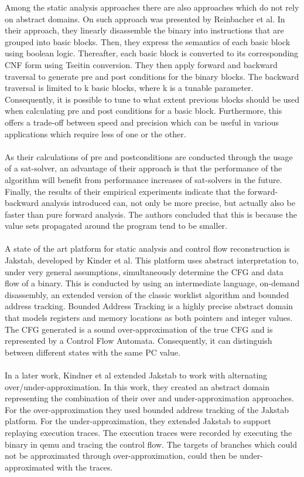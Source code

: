 \documentclass{kththesis}
\begin{document}
Among the static analysis approaches there are also approaches which do not rely on abstract domains. On such approach was presented by Reinbacher et al. In their approach, they linearly disassemble the binary into instructions that are grouped into basic blocks. Then, they express the semantics of each basic block using boolean logic. Thereafter, each basic block is converted to its corresponding CNF form using Tseitin conversion. They then apply forward and backward traversal to generate pre and post conditions for the binary blocks. The backward traversal is limited to k basic blocks, where k is a tunable parameter. Consequently, it is possible to tune to what extent previous blocks should be used when calculating pre and post conditions for a basic block. Furthermore, this offers a trade-off between speed and precision which can be useful in various applications which require less of one or the other.
\\ \\
As their calculations of pre and postconditions are conducted through the usage of a sat-solver, an advantage of their approach is that the performance of the algorithm will benefit from performance increases of sat-solvers in the future. Finally, the results of their empirical experiments indicate that the forward-backward analysis introduced can, not only be more precise, but actually also be faster than pure forward analysis. The authors concluded that this is because the value sets propagated around the program tend to be smaller.
\\ \\
A state of the art platform for static analysis and control flow reconstruction is Jakstab\cite{JakstabGit}, developed by Kinder et al\cite{Jakstab}. This platform uses abstract interpretation to, under very general assumptions, simultaneously determine the CFG and data flow of a binary. This is conducted by using an intermediate language, on-demand disassembly, an extended version of the classic worklist algorithm and bounded address tracking. Bounded Address Tracking is a highly precise abstract domain that models registers and memory locations as both pointers and integer values. The CFG generated is a sound over-approximation of the true CFG and is represented by a Control Flow Automata. Consequently, it can distinguish between different states with the same PC value.
\\ \\
In a later work, Kindner et al extended Jakstab to work with alternating over/under-approximation\cite{alternating}. In this work, they created an abstract domain representing the combination of their over and under-approximation approaches. For the over-approximation they used bounded address tracking of the Jakstab platform. For the under-approximation, they extended Jakstab to support replaying execution traces. The execution traces were recorded by executing the binary in qemu and tracing the control flow. The targets of branches which could not be approximated through over-approximation, could then be under-approximated with the traces. 
\end{document}
